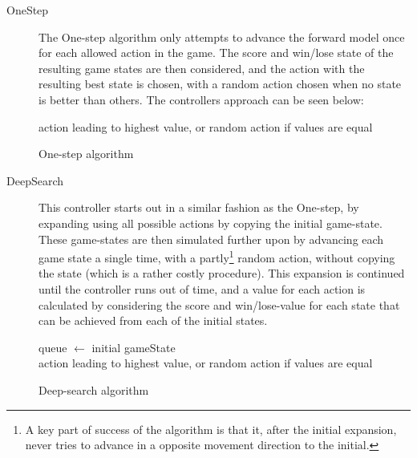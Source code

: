 \documentclass[a4paper,titlepage,final]{report}
\begin{document}
\begin{description}
\item[OneStep] The One-step algorithm only attempts to advance the forward model once for each allowed action in the game.
The score and win/lose state of the resulting game states are then considered, and the action with the resulting best state is chosen, with a random action chosen when no state is better than others.
The controllers approach can be seen below:

\begin{algorithm}[H]
\Return action leading to highest value, or random action if values are equal
\caption{One-step algorithm}
\end{algorithm}

\item[DeepSearch]
This controller starts out in a similar fashion as the One-step, by expanding using all possible actions by copying the initial game-state.
These game-states are then simulated further upon by advancing each game state a single time, with a partly\footnote{A key part of success of the algorithm is that it, after the initial expansion, never tries to advance in a opposite movement direction to the initial.} random action, without copying the state (which is a rather costly procedure).
This expansion is continued until the controller runs out of time, and a value for each action is calculated by considering the score and win/lose-value for each state that can be achieved from each of the initial states. \\

\begin{algorithm}[H]
queue $\gets$ initial gameState \\
\Return action leading to highest value, or random action if values are equal
\caption{Deep-search algorithm}
\end{algorithm}


\end{description}
\end{document}

